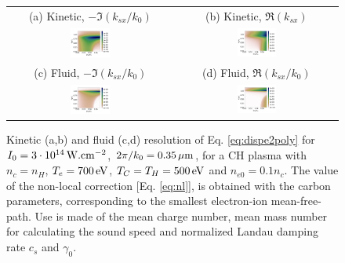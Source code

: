 \documentclass[
 reprint,
 amsmath,amssymb,
 aps,
]{revtex4-1}
\begin{document}
\begin{figure}
\begin{tabular}{cc}
(a) Kinetic, $-\Im(k_{sx}/k_0)$ &
(b)  Kinetic, $\Re(k_{sx})$ \\
\includegraphics[width=0.25\textwidth]{G_Te700eV_Ti500_3e14_3w_1e-1nc_CH.png}&
\includegraphics[width=0.25\textwidth]{k_Te700eV_Ti500_3e14_3w_1e-1nc_CH.png}\\
(c) Fluid, $-\Im(k_{sx}/k_0)$  &
(d) Fluid, $\Re(k_{sx}/k_0)$  \\
\includegraphics[width=0.25\textwidth]{Gf_Te700eV_Ti500_3e14_3w_1e-1nc_CH.png}&
\includegraphics[width=0.25\textwidth]{kf_Te700eV_Ti500_3e14_3w_1e-1nc_CH.png}
\end{tabular}
\caption{ \label{fig:dispeCH}  
Kinetic (a,b) and fluid (c,d) resolution of Eq. \eqref{eq:dispe2poly} for  $I_0 = 3\cdot 10^{14}\, \rm W.cm^{-2}$, $2\pi/k_0=0.35 \,\rm\mu m$, for a CH plasma with $n_c=n_H$, $T_e =700\,\rm  eV$, $T_C=T_H =500\,  \rm eV$ and $n_{e0}=0.1n_c$. The value of the non-local correction [Eq. \eqref{eq:nl}], is obtained with the carbon parameters, corresponding to the smallest electron-ion mean-free-path. Use is made of the mean charge number, mean mass number   for calculating the sound speed and normalized Landau damping rate $c_s$ and $\gamma_0$.
 }
\end{figure}
\end{document}
